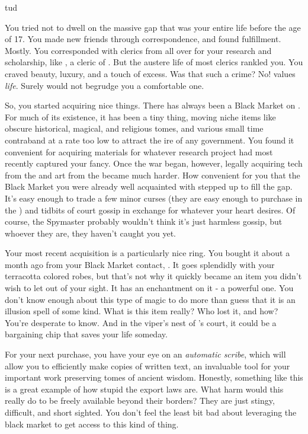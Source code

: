 tud\documentclass[char]{GL2020}
\begin{document}
You tried not to dwell on the massive gap that was your entire life before the age of 17. You made new friends through correspondence, and found fulfillment. Mostly. You corresponded with clerics from all over for your research and scholarship, like \cEbbPriest{\full}, a cleric of \cEbb{}. But the austere life of most clerics rankled you. You craved beauty, luxury, and a touch of excess. Was that such a crime? No! \cFarmGod{} values \emph{life}. Surely \cFarmGod{\They} would not begrudge you a comfortable one.

So, you started acquiring nice things. There has always been a Black Market on \pEarth{}. For much of its existence, it has been a tiny thing, moving niche items like obscure historical, magical, and religious tomes, and various small time contraband at a rate too low to attract the ire of any government. You found it convenient for acquiring materials for whatever research project had most recently captured your fancy. Once the war began, however, legally acquiring tech from the \pTech{} and art from the \pShip{} became much harder. How convenient for you that the Black Market you were already well acquainted with stepped up to fill the gap. It's easy enough to trade a few minor curses (they are easy enough to purchase in the \pFarm{}) and tidbits of court gossip in exchange for whatever your heart desires. Of course, the \pFarm{} Spymaster probably wouldn't think it's just harmless gossip, but whoever they are, they haven't caught you yet.

Your most recent acquisition is a particularly nice ring. You bought it about a month ago from your Black Market contact, \cChupSecond{\full}. It goes splendidly with your terracotta colored robes, but that’s not why it quickly became an item you didn’t wish to let out of your sight. It has an enchantment on it - a powerful one. You don’t know enough about this type of magic to do more than guess that it is an illusion spell of some kind. What is this item really? Who lost it, and how? You’re desperate to know. And in the viper’s nest of \cQueen{\Majesty} \cQueen{}’s court, it could be a bargaining chip that saves your life someday.

For your next purchase, you have your eye on an \emph{automatic scribe}, which will allow you to efficiently make copies of written text, an invaluable tool for your important work preserving tomes of ancient wisdom. Honestly, something like this is a great example of how stupid the \pTech{} export laws are. What harm would this really do to be freely available beyond their borders? They are just stingy, difficult, and short sighted. You don’t feel the least bit bad about leveraging the black market to get access to this kind of thing.
\end{document}
